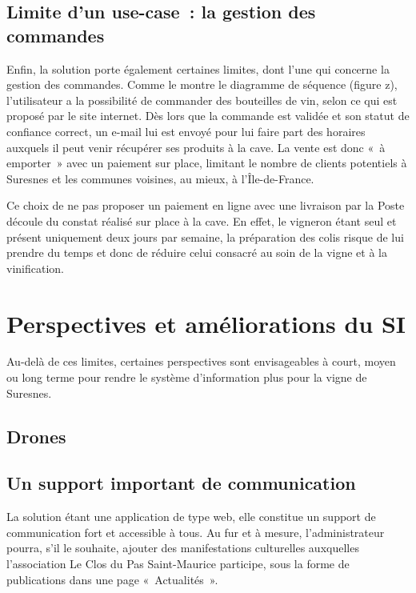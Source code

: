 \documentclass[a4paper, title]{report}
\begin{document}
\subsection{Limite d'un use-case~: la gestion des commandes}\label{limite-dun-use-case-la-gestion-des-commandes}

Enfin, la solution porte également certaines limites, dont l'une qui
concerne la gestion des commandes. Comme le montre le diagramme de
séquence (figure z), l'utilisateur a la possibilité de commander des
bouteilles de vin, selon ce qui est proposé par le site internet. Dès
lors que la commande est validée et son statut de confiance correct, un
e-mail lui est envoyé pour lui faire part des horaires auxquels il peut
venir récupérer ses produits à la cave. La vente est donc «~à emporter~»
avec un paiement sur place, limitant le nombre de clients potentiels à
Suresnes et les communes voisines, au mieux, à l'Île-de-France.

Ce choix de ne pas proposer un paiement en ligne avec une livraison par
la Poste découle du constat réalisé sur place à la cave. En effet, le
vigneron étant seul et présent uniquement deux jours par semaine, la
préparation des colis risque de lui prendre du temps et donc de réduire
celui consacré au soin de la vigne et à la vinification.

\section{Perspectives et améliorations du SI}\label{perspectives-et-amuxe9liorations-du-si}

Au-delà de ces limites, certaines perspectives sont envisageables à
court, moyen ou long terme pour rendre le système d'information plus
pour la vigne de Suresnes.

\subsection{Drones}\label{drones}

\subsection{Un support important de communication}\label{un-support-important-de-communication}

La solution étant une application de type web, elle constitue un support
de communication fort et accessible à tous. Au fur et à mesure,
l'administrateur pourra, s'il le souhaite, ajouter des manifestations
culturelles auxquelles l'association Le Clos du Pas Saint-Maurice
participe, sous la forme de publications dans une page «~Actualités~».
\end{document}
